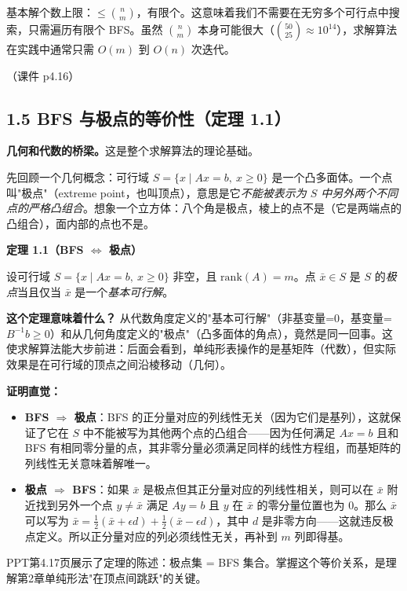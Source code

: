 基本解个数上限：$\le \binom{n}{m}$，有限个。这意味着我们不需要在无穷多个可行点中搜索，只需遍历有限个 BFS。虽然 $\binom{n}{m}$ 本身可能很大（$\binom{50}{25}\approx 10^{14}$），求解算法在实践中通常只需 $O(m)$ 到 $O(n)$ 次迭代。

（课件 p4.16）

\subsection{1.5 BFS 与极点的等价性（定理 1.1）}

\textbf{几何和代数的桥梁。}这是整个求解算法的理论基础。

先回顾一个几何概念：可行域 $S=\{x\mid Ax=b,\ x\ge 0\}$ 是一个凸多面体。一个点叫"极点"（extreme point，也叫顶点），意思是它\emph{不能被表示为 $S$ 中另外两个不同点的严格凸组合}。想象一个立方体：八个角是极点，棱上的点不是（它是两端点的凸组合），面内部的点也不是。

\textbf{定理 1.1（BFS $\Leftrightarrow$ 极点）}

设可行域 $S = \{x \mid Ax = b,\ x \ge 0\}$ 非空，且 $\mathrm{rank}(A)=m$。点 $\bar{x} \in S$ 是 $S$ 的\emph{极点}当且仅当 $\bar{x}$ 是一个\emph{基本可行解}。

\textbf{这个定理意味着什么？} 从代数角度定义的"基本可行解"（非基变量=0，基变量=$B^{-1}b\ge0$）和从几何角度定义的"极点"（凸多面体的角点），竟然是同一回事。这使求解算法能大步前进：后面会看到，单纯形表操作的是基矩阵（代数），但实际效果是在可行域的顶点之间沿棱移动（几何）。

\textbf{证明直觉：}
\begin{itemize}
  \item \textbf{BFS $\Rightarrow$ 极点}：BFS 的正分量对应的列线性无关（因为它们是基列），这就保证了它在 $S$ 中不能被写为其他两个点的凸组合——因为任何满足 $Ax=b$ 且和 BFS 有相同零分量的点，其非零分量必须满足同样的线性方程组，而基矩阵的列线性无关意味着解唯一。
  \item \textbf{极点 $\Rightarrow$ BFS}：如果 $\bar{x}$ 是极点但其正分量对应的列线性相关，则可以在 $\bar{x}$ 附近找到另外一个点 $y\neq \bar{x}$ 满足 $Ay=b$ 且 $y$ 在 $\bar{x}$ 的零分量位置也为 0。那么 $\bar{x}$ 可以写为 $\bar{x}=\frac{1}{2}(\bar{x}+\epsilon d)+\frac{1}{2}(\bar{x}-\epsilon d)$，其中 $d$ 是非零方向——这就违反极点定义。所以正分量对应的列必须线性无关，再补到 $m$ 列即得基。
\end{itemize}

PPT第4.17页展示了定理的陈述：极点集 = BFS 集合。掌握这个等价关系，是理解第2章单纯形法"在顶点间跳跃"的关键。

